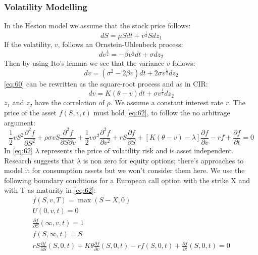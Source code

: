 \documentclass{article}
\begin{document}
\subsubsection{Volatility Modelling}
In the Heston model we assume that the stock price follows:
\begin{equation}
    dS = \mu S dt + v^{\frac{1}{2}}Sdz_{1}
\end{equation}
If the volatility, $v$, follows an Ornstein-Uhlenbeck process:
\begin{equation}
    dv^{\frac{1}{2}} = -\beta v^{\frac{1}{2}} dt + \sigma dz_{2}
\end{equation}
Then by using Ito’s lemma we see that the variance $v$ follows:
\begin{equation} \label{eq:60}
    dv = (\sigma ^{2} - 2\beta v)dt + 2 \sigma v^{\frac{1}{2}}dz_{2}
\end{equation}
\ref{eq:60} can be rewritten as the square-root process and as in CIR:
\begin{equation}
    dv = K(\theta - v) dt + \sigma v^{\frac{1}{2}} dz_{2}
\end{equation}
$z_{1}$ and $z_{2}$ have the correlation of $\rho$. We assume a constant interest rate $r$. The price of the asset $f(S, v, t)$ must hold \ref{eq:62}, to follow the no arbitrage argument:
\begin{equation} \label{eq:62}
    \frac{1}{2}vS^{2}\frac{\partial^{2} f}{\partial S^{2}} + \rho \sigma v S \frac{\partial^{2} f}{\partial S \partial v} + \frac{1}{2}v\sigma^{2}\frac{\partial^{2} f}{\partial v^{2}} + r S \frac{\partial f}{\partial S} + [K(\theta - v) - \lambda] \frac{\partial f}{\partial v} - rf + \frac{\partial f}{\partial t} = 0
\end{equation}
In \ref{eq:62} $\lambda$ represents the price of volatility risk and is asset independent.  Research suggests that $\lambda$ is non zero for equity options; there’s approaches to model it for consumption assets but we won’t consider them here. We use the following boundary conditions for a European call option with the strike X and with T as maturity in \ref{eq:62}: 
\begin{equation} \label{eq:63}
    \begin{gathered}
    f(S, v, T) = \max(S - X, 0) \\ 
    U(0, v, t) = 0 \\
    \frac{\partial f}{\partial S} (\infty, v, t) = 1 \\
    f (S, \infty, t ) = S \\ 
    r S \frac{\partial f}{\partial S} (S, 0, t) + K \theta \frac{\partial f}{\partial v} (S, 0, t) - r f(S, 0, t) + \frac{\partial f}{\partial t} (S, 0, t) = 0
    \end{gathered}
\end{equation}
\end{document}
